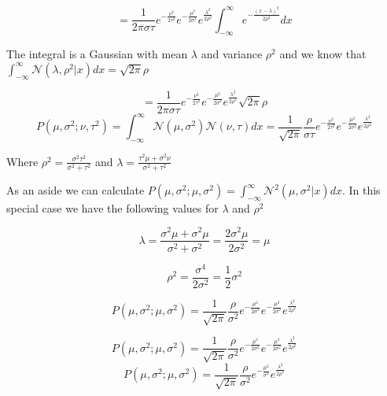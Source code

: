 \documentclass{article}
\begin{document}
\begin{equation}
    = \frac{1}{2\pi\sigma\tau} e^{-\frac{\nu^2}{2\tau^2}}e^{ - \frac{\mu^2}{2\sigma^2}}
    e^{\frac{\lambda^2}{2\rho^2}} \int_{-\infty}^\infty e^{-\frac{(x - \lambda)^2}{2 \rho^2}}
     dx
\end{equation}

The integral is a Gaussian with mean $\lambda$ and variance $\rho^2$ and we know that $\int_{-\infty}^\infty \mathcal{N}(\lambda, \rho^2|x) dx = \sqrt{2\pi}\rho$

\begin{equation}
    = \frac{1}{2\pi\sigma\tau} e^{-\frac{\nu^2}{2\tau^2}}e^{ - \frac{\mu^2}{2\sigma^2}}
    e^{\frac{\lambda^2}{2\rho^2}} \sqrt{2\pi}\rho
\end{equation}
\begin{equation}
\label{eqn:prodgaus}
    P(\mu, \sigma^2; \nu, \tau^2) = \int_{-\infty}^\infty \mathcal{N}(\mu, \sigma^2) \mathcal{N}(\nu, \tau) dx = \frac{1}{\sqrt{2\pi}}\frac{\rho}{\sigma\tau} e^{-\frac{\nu^2}{2\tau^2}}e^{ - \frac{\mu^2}{2\sigma^2}}
    e^{\frac{\lambda^2}{2\rho^2}}
\end{equation}

Where $\rho^2=\frac{\sigma^2\tau^2}{\sigma^2+\tau^2}$ and $\lambda=\frac{\tau^2\mu+\sigma^2\nu}{\sigma^2+\tau^2}$ \par

As an aside we can calculate $P(\mu,\sigma^2;\mu,\sigma^2)=\int_{-\infty}^\infty \mathcal{N}^2(\mu, \sigma^2|x) dx$.  In this special case we have the following values for $\lambda$ and $\rho^2$\par

\begin{equation}
    \lambda = \frac{\sigma^2\mu+\sigma^2\mu}{\sigma^2 + \sigma^2} 
            = \frac{2\sigma^2\mu}{2\sigma^2} 
            = \mu
\end{equation}

\begin{equation}
    \rho^2 = \frac{\sigma^4}{2\sigma^2} = \frac{1}{2}\sigma^2
\end{equation}

\begin{equation}
    P(\mu,\sigma^2;\mu,\sigma^2) = \frac{1}{\sqrt{2\pi}}\frac{\rho}{\sigma^2}e^{-\frac{\mu^2}{2\sigma^2}}e^{-\frac{\mu^2}{2\sigma^2}}e^{\frac{\lambda^2}{2\rho^2}}
\end{equation}

\begin{equation}
    P(\mu,\sigma^2;\mu,\sigma^2) = \frac{1}{\sqrt{2\pi}}\frac{\rho}{\sigma^2}e^{-\frac{\mu^2}{2\sigma^2}}e^{-\frac{\mu^2}{2\sigma^2}}e^{\frac{\lambda^2}{2\rho^2}}
\end{equation}
\begin{equation}
    P(\mu,\sigma^2;\mu,\sigma^2) = \frac{1}{\sqrt{2\pi}}\frac{\rho}{\sigma^2}e^{-\frac{\mu^2}{\sigma^2}}e^{\frac{\lambda^2}{2\rho^2}}
\end{equation}
\end{document}

